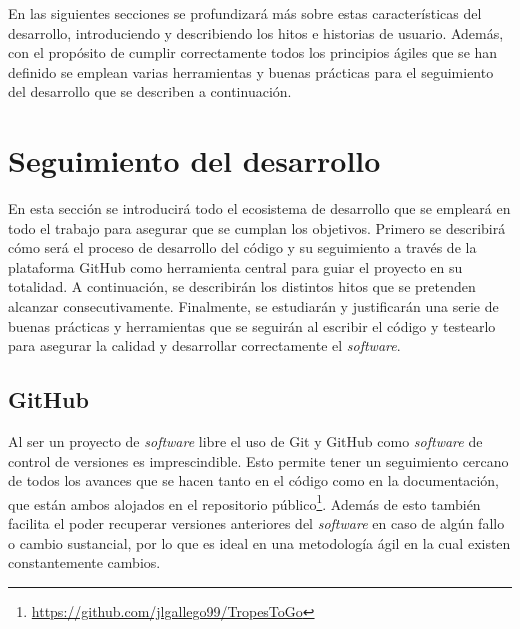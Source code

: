 En las siguientes secciones se profundizará más sobre estas características del
desarrollo, introduciendo y describiendo los hitos e historias de usuario.
Además, con el propósito de cumplir correctamente todos los principios ágiles
que se han definido se emplean varias herramientas y buenas prácticas para el
seguimiento del desarrollo que se describen a continuación.

\section{Seguimiento del desarrollo}
En esta sección se introducirá todo el ecosistema de desarrollo que se empleará
en todo el trabajo para asegurar que se cumplan los objetivos. Primero se
describirá cómo será el proceso de desarrollo del código y su seguimiento a
través de la plataforma GitHub como herramienta central para guiar el proyecto
en su totalidad. A continuación, se describirán los distintos hitos que se
pretenden alcanzar consecutivamente. Finalmente, se estudiarán y justificarán
una serie de buenas prácticas y herramientas que se seguirán al escribir el
código y testearlo para asegurar la calidad y desarrollar correctamente el
\textit{software}.

\subsection{GitHub}
Al ser un proyecto de \textit{software} libre el uso de Git y GitHub como
\textit{software} de control de versiones es imprescindible. Esto permite tener
un seguimiento cercano de todos los avances que se hacen tanto en el código como
en la documentación, que están ambos alojados en el repositorio
público\footnote{\url{https://github.com/jlgallego99/TropesToGo}}. Además de
esto también facilita el poder recuperar versiones anteriores del
\textit{software} en caso de algún fallo o cambio sustancial, por lo que es
ideal en una metodología ágil en la cual existen constantemente cambios.

